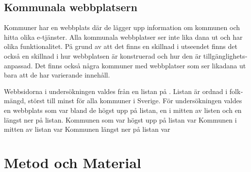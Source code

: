 \documentclass[11p]{article}
\begin{document}
\begin{otherlanguage}{swedish}
    \subsection{Kommunala webbplatsern} %
    Kommuner har en webbplats där de lägger upp information om kommunen och hitta olika e-tjänster.
    Alla kommunala webbplatser ser inte lika dana ut och har olika funktionalitet.
    På grund av att det finns en skillnad i utseendet finns det också en skillnad i hur webbplatsen är konstruerad och hur den är tillgänglighetsanpassad.
    Det finns också några kommuner med webbplatser som ser likadana ut bara att de har varierande innehåll.
    
    Webbsidorna i undersökningen valdes från en listan på \textcite{SverigesKommuner}.
    Listan är ordnad i folkmängd, störst till minst för alla kommuner i Sverige.
    För undersökningen valdes en webbplats som var bland de högst upp på listan, en i mitten av listen och en längst ner på listan.
    Kommunen som var högst upp på listan var \textcite{Linköpings_kommun}
    Kommunen i mitten av listan var \textcite{Höörs_kommun}
    Kommunen längst ner på listan var \textcite{Sorsele_kommun}
    
    \section{Metod och Material}


\end{otherlanguage}
\end{document}
